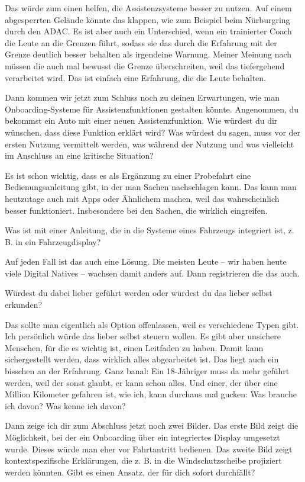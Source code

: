 Das würde zum einen helfen, die Assistenzsysteme besser zu nutzen. Auf
einem abgesperrten Gelände könnte das klappen, wie zum Beispiel beim
Nürburgring durch den ADAC. Es ist aber auch ein Unterschied, wenn ein
trainierter Coach die Leute an die Grenzen führt, sodass sie das durch
die Erfahrung mit der Grenze deutlich besser behalten als irgendeine
Warnung. Meiner Meinung nach müssen die auch mal bewusst die Grenze
überschreiten, weil das tiefergehend verarbeitet wird. Das ist einfach
eine Erfahrung, die die Leute behalten.

\interviewerin
Dann kommen wir jetzt zum Schluss noch zu deinen Erwartungen, wie man
Onboarding-Systeme für Assistenzfunktionen gestalten könnte. Angenommen,
du bekommst ein Auto mit einer neuen Assistenzfunktion. Wie würdest du
dir wünschen, dass diese Funktion erklärt wird? Was würdest du sagen,
muss vor der ersten Nutzung vermittelt werden, was während der Nutzung
und was vielleicht im Anschluss an eine kritische Situation?

Es ist schon wichtig, dass es als Ergänzung zu einer Probefahrt eine
Bedienungsanleitung gibt, in der man Sachen nachschlagen kann. Das kann
man heutzutage auch mit Apps oder Ähnlichem machen, weil das
wahrscheinlich besser funktioniert. Insbesondere bei den Sachen, die
wirklich eingreifen.

\interviewerin
Was ist mit einer Anleitung, die in die Systeme eines Fahrzeugs
integriert ist, z. B. in ein Fahrzeugdisplay?

Auf jeden Fall ist das auch eine Lösung. Die meisten Leute – wir haben
heute viele Digital Natives – wachsen damit anders auf. Dann
registrieren die das auch.

\interviewerin
Würdest du dabei lieber geführt werden oder würdest du das lieber
selbst erkunden?

Das sollte man eigentlich als Option offenlassen, weil es verschiedene
Typen gibt. Ich persönlich würde das lieber selbst steuern wollen. Es
gibt aber unsichere Menschen, für die es wichtig ist, einen Leitfaden
zu haben. Damit kann sichergestellt werden, dass wirklich alles
abgearbeitet ist. Das liegt auch ein bisschen an der Erfahrung. Ganz
banal: Ein 18-Jähriger muss da mehr geführt werden, weil der sonst
glaubt, er kann schon alles. Und einer, der über eine Million Kilometer
gefahren ist, wie ich, kann durchaus mal gucken: Was brauche ich davon?
Was kenne ich davon?

\interviewerin
Dann zeige ich dir zum Abschluss jetzt noch zwei Bilder. Das erste Bild
zeigt die Möglichkeit, bei der ein Onboarding über ein integriertes
Display umgesetzt wurde. Dieses würde man eher vor Fahrtantritt
bedienen. Das zweite Bild zeigt kontextspezifische Erklärungen, die
z. B. in die Windschutzscheibe projiziert werden könnten. Gibt es einen
Ansatz, der für dich sofort durchfällt?

